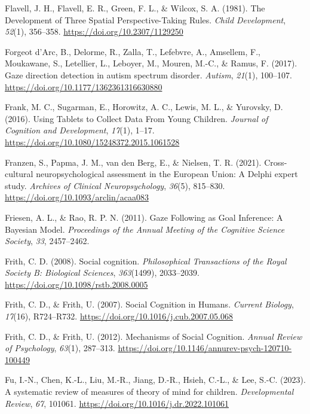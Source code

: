 \documentclass[
]{scrbook}
\newlength{\cslhangindent}
\newenvironment{CSLReferences}[2] %
 {\begin{list}{}{%
  \setlength{\itemindent}{0pt}
  \setlength{\leftmargin}{0pt}
  \setlength{\parsep}{0pt}
  \ifodd #1
   \setlength{\leftmargin}{\cslhangindent}
   \setlength{\itemindent}{-1\cslhangindent}
  \fi
  \setlength{\itemsep}{#2\baselineskip}}}
 {\end{list}}
\begin{document}
\begin{CSLReferences}{1}{0}
Flavell, J. H., Flavell, E. R., Green, F. L., \& Wilcox, S. A. (1981). The {Development} of {Three Spatial Perspective-Taking Rules}. \emph{Child Development}, \emph{52}(1), 356--358. \url{https://doi.org/10.2307/1129250}

Forgeot d'Arc, B., Delorme, R., Zalla, T., Lefebvre, A., Amsellem, F., Moukawane, S., Letellier, L., Leboyer, M., Mouren, M.-C., \& Ramus, F. (2017). Gaze direction detection in autism spectrum disorder. \emph{Autism}, \emph{21}(1), 100--107. \url{https://doi.org/10.1177/1362361316630880}

Frank, M. C., Sugarman, E., Horowitz, A. C., Lewis, M. L., \& Yurovsky, D. (2016). Using {Tablets} to {Collect Data From Young Children}. \emph{Journal of Cognition and Development}, \emph{17}(1), 1--17. \url{https://doi.org/10.1080/15248372.2015.1061528}

Franzen, S., Papma, J. M., van den Berg, E., \& Nielsen, T. R. (2021). Cross-cultural neuropsychological assessment in the {European Union}: A {Delphi} expert study. \emph{Archives of Clinical Neuropsychology}, \emph{36}(5), 815--830. \url{https://doi.org/10.1093/arclin/acaa083}

Friesen, A. L., \& Rao, R. P. N. (2011). Gaze {Following} as {Goal Inference}: {A Bayesian Model}. \emph{Proceedings of the Annual Meeting of the Cognitive Science Society}, \emph{33}, 2457--2462.

Frith, C. D. (2008). Social cognition. \emph{Philosophical Transactions of the Royal Society B: Biological Sciences}, \emph{363}(1499), 2033--2039. \url{https://doi.org/10.1098/rstb.2008.0005}

Frith, C. D., \& Frith, U. (2007). Social {Cognition} in {Humans}. \emph{Current Biology}, \emph{17}(16), R724--R732. \url{https://doi.org/10.1016/j.cub.2007.05.068}

Frith, C. D., \& Frith, U. (2012). Mechanisms of {Social Cognition}. \emph{Annual Review of Psychology}, \emph{63}(1), 287--313. \url{https://doi.org/10.1146/annurev-psych-120710-100449}

Fu, I.-N., Chen, K.-L., Liu, M.-R., Jiang, D.-R., Hsieh, C.-L., \& Lee, S.-C. (2023). A systematic review of measures of theory of mind for children. \emph{Developmental Review}, \emph{67}, 101061. \url{https://doi.org/10.1016/j.dr.2022.101061}


\end{CSLReferences}
\end{document}
